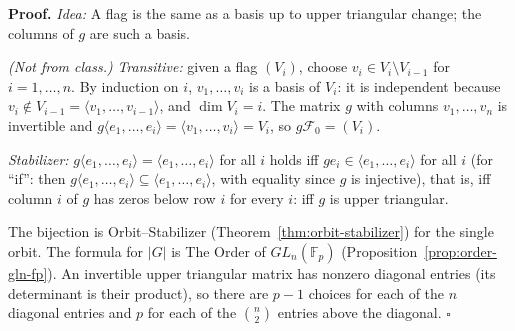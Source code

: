 \documentclass[11pt]{report}
\renewenvironment{proof}[1][Proof]{\noindent\textbf{#1.} }{\hfill$\square$\par\vspace{5pt}}
\begin{document}
\begin{proof}
\textit{Idea:} A flag is the same as a basis up to upper triangular change; the columns of $g$ are such a basis.\par
\textit{(Not from class.)} \emph{Transitive:} given a flag $(V_i)$, choose $v_i \in V_i \setminus V_{i-1}$ for $i = 1, \ldots, n$. By induction on $i$, $v_1, \ldots, v_i$ is a basis of $V_i$: it is independent because $v_i \notin V_{i-1} = \langle v_1, \ldots, v_{i-1} \rangle$, and $\dim V_i = i$. The matrix $g$ with columns $v_1, \ldots, v_n$ is invertible and $g\langle e_1, \ldots, e_i \rangle = \langle v_1, \ldots, v_i \rangle = V_i$, so $g\mathcal{F}_0 = (V_i)$.

\emph{Stabilizer:} $g\langle e_1, \ldots, e_i \rangle = \langle e_1, \ldots, e_i \rangle$ for all $i$ holds iff $ge_i \in \langle e_1, \ldots, e_i \rangle$ for all $i$ (for ``if'': then $g\langle e_1, \ldots, e_i \rangle \subseteq \langle e_1, \ldots, e_i \rangle$, with equality since $g$ is injective), that is, iff column $i$ of $g$ has zeros below row $i$ for every $i$: iff $g$ is upper triangular.

The bijection is Orbit--Stabilizer (Theorem~\ref{thm:orbit-stabilizer}) for the single orbit. The formula for $|G|$ is The Order of $GL_n(\mathbb{F}_p)$ (Proposition~\ref{prop:order-gln-fp}). An invertible upper triangular matrix has nonzero diagonal entries (its determinant is their product), so there are $p - 1$ choices for each of the $n$ diagonal entries and $p$ for each of the $\binom{n}{2}$ entries above the diagonal.
\end{proof}
\end{document}
